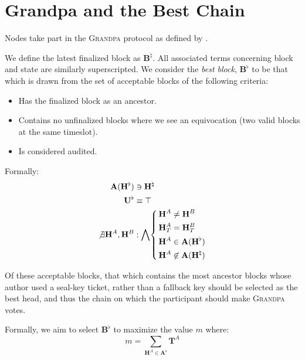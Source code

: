 \section{Grandpa and the Best Chain}\label{sec:bestchain}\label{sec:grandpa}

Nodes take part in the \textsc{Grandpa} protocol as defined by \cite{stewart2020grandpa}.

\newcommand{\final}{\natural}
\newcommand{\best}{\flat}

We define the latest finalized block as $\mathbf{B}^\final$. All associated terms concerning block and state are similarly superscripted. We consider the \emph{best block}, $\mathbf{B}^\best$ to be that which is drawn from the set of acceptable blocks of the following criteria:

\begin{itemize}
  \item Has the finalized block as an ancestor.
  \item Contains no unfinalized blocks where we see an equivocation (two valid blocks at the same timeslot).
  \item Is considered audited.
\end{itemize}

Formally:
\begin{align}
  \mathbf{A}(\mathbf{H}^\best) &\owns \mathbf{H}^\final \\
  \mathbf{U}^\best &\equiv \top \\
  \not\exists \mathbf{H}^A, \mathbf{H}^B &: \bigwedge \left\{\,\begin{aligned}
    \mathbf{H}^A &\ne \mathbf{H}^B \\
    \mathbf{H}^A_T &= \mathbf{H}^B_T \\
    \mathbf{H}^A &\in \mathbf{A}(\mathbf{H}^\best) \\
    \mathbf{H}^A &\not\in \mathbf{A}(\mathbf{H}^\final)
  \end{aligned}\right.
\end{align}

Of these acceptable blocks, that which contains the most ancestor blocks whose author used a seal-key ticket, rather than a fallback key should be selected as the best head, and thus the chain on which the participant should make \textsc{Grandpa} votes.

Formally, we aim to select $\mathbf{B}^\best$ to maximize the value $m$ where:
\begin{equation}
  m = \sum_{\mathbf{H}^A \in \mathbf{A}^\best} \mathbf{T}^A
\end{equation}

